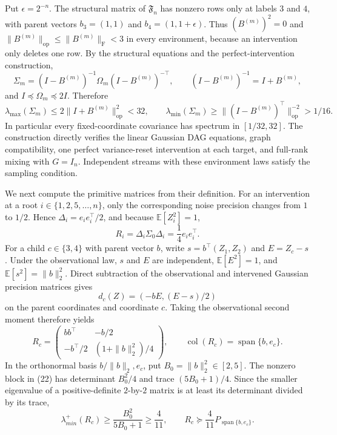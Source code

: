 Put \(\epsilon=2^{-n}\).  The structural matrix of \(\mathfrak F_n\) has nonzero rows only at labels \(3\) and \(4\), with parent vectors \(b_3=(1,1)\) and \(b_4=(1,1+\epsilon)\).  Thus \((B^{(m)})^2=0\) and \(\|B^{(m)}\|_{\mathrm{op}}\le\|B^{(m)}\|_{\mathrm F}<3\) in every environment, because an intervention only deletes one row.  By the structural equations and the perfect-intervention construction,
\[
\Sigma_m=(I-B^{(m)})^{-1}\Omega_m(I-B^{(m)})^{-\top},
\qquad
(I-B^{(m)})^{-1}=I+B^{(m)},
\]
and \(I\preceq\Omega_m\preceq2I\).  Therefore
\[
 \lambda_{\max}(\Sigma_m)
 \le2\|I+B^{(m)}\|_{\mathrm{op}}^2<32,
 \qquad
 \lambda_{\min}(\Sigma_m)
 \ge\|(I-B^{(m)})^{\top}\|_{\mathrm{op}}^{-2}>1/16.
 \tag{20}
\]
In particular every fixed-coordinate covariance has spectrum in \([1/32,32]\).  The construction directly verifies the linear Gaussian DAG equations, graph compatibility, one perfect variance-reset intervention at each target, and full-rank mixing with \(G=I_n\).  Independent streams with these environment laws satisfy the sampling condition.

We next compute the primitive matrices from their definition.  For an intervention at a root \(i\in\{1,2,5,\ldots,n\}\), only the corresponding noise precision changes from \(1\) to \(1/2\).  Hence \(\Delta_i=e_ie_i^{\top}/2\), and because \(\mathbb E[Z_i^2]=1\),
\[
 R_i=\Delta_i\Sigma_0\Delta_i=\frac14e_ie_i^{\top}.
 \tag{21}
\]
For a child \(c\in\{3,4\}\) with parent vector \(b\), write \(s=b^{\top}(Z_1,Z_2)\) and \(E=Z_c-s\).  Under the observational law, \(s\) and \(E\) are independent, \(\mathbb E[E^2]=1\), and \(\mathbb E[s^2]=\|b\|_2^2\).  Direct subtraction of the observational and intervened Gaussian precision matrices gives
\[
d_c(Z)=(-bE,(E-s)/2)
\]
on the parent coordinates and coordinate \(c\).  Taking the observational second moment therefore yields
\[
 R_c=
 \begin{pmatrix}
 bb^{\top}&-b/2\\
 -b^{\top}/2&(1+\|b\|_2^2)/4
 \end{pmatrix},
 \qquad
 \operatorname{col}(R_c)=\operatorname{span}\{b,e_c\}.
 \tag{22}
\]
In the orthonormal basis \(b/\|b\|_2,e_c\), put \(B_0=\|b\|_2^2\in[2,5]\).  The nonzero block in (22) has determinant \(B_0^2/4\) and trace \((5B_0+1)/4\).  Since the smaller eigenvalue of a positive-definite \(2\)-by-\(2\) matrix is at least its determinant divided by its trace,
\[
 \lambda_{min}^{+}(R_c)
 \ge\frac{B_0^2}{5B_0+1}\ge\frac4{11},
 \qquad
 R_c\succeq\frac4{11}P_{\operatorname{span}\{b,e_c\}}.
 \tag{23}
\]

